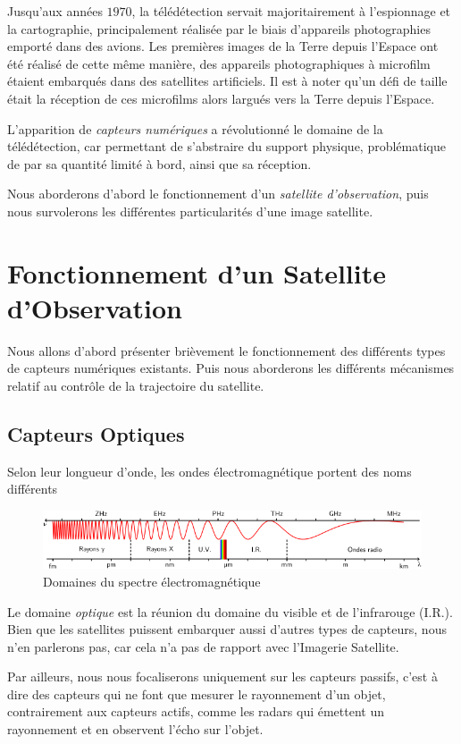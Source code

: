 \documentclass[a4paper, 10pt]{report}
\begin{document}
Jusqu'aux années $1970$, la télédétection servait majoritairement à l'espionnage et la cartographie, principalement réalisée par le biais d'appareils photographies emporté dans des avions.
Les premières images de la Terre depuis l'Espace ont été réalisé de cette même manière, des appareils photographiques à microfilm étaient embarqués dans des satellites artificiels. Il est à noter qu'un défi de taille était la réception de ces microfilms alors largués vers la Terre depuis l'Espace.

L'apparition de \emph{capteurs numériques} a révolutionné le domaine de la télédétection, car permettant de s'abstraire du support physique, problématique de par sa quantité limité à bord, ainsi que sa réception.

Nous aborderons d'abord le fonctionnement d'un \emph{satellite d'observation}, puis nous survolerons les différentes particularités d'une image satellite.
\section{Fonctionnement d'un Satellite d'Observation}
Nous allons d'abord présenter brièvement le fonctionnement des différents types de capteurs numériques existants.
Puis nous aborderons les différents mécanismes relatif au contrôle de la trajectoire du satellite.
\subsection{Capteurs Optiques}
Selon leur longueur d'onde, les ondes électromagnétique portent des noms différents
\begin{figure}[H]
	\begin{center}
		\includegraphics[scale=0.5]{Images/Spectre_Electromagnetique.png}
		\caption{Domaines du spectre électromagnétique}
	\end{center}
\end{figure}
Le domaine \emph{optique} est la réunion du domaine du visible et de l'infrarouge (I.R.).
Bien que les satellites puissent embarquer aussi d'autres types de capteurs, nous n'en parlerons pas, car cela n'a pas de rapport avec l'Imagerie Satellite.

Par ailleurs, nous nous focaliserons uniquement sur les capteurs passifs, c'est à dire des capteurs qui ne font que mesurer le rayonnement d'un objet, contrairement aux capteurs actifs, comme les radars qui émettent un rayonnement et en observent l'écho sur l'objet.
\end{document}
